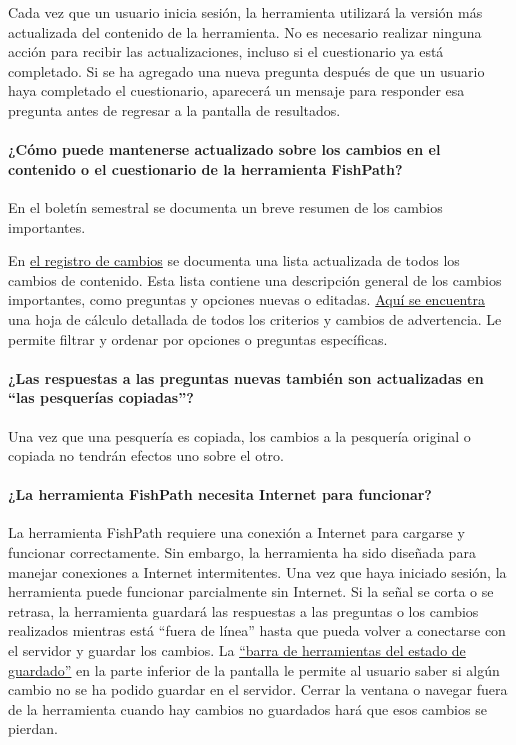 \documentclass[
  11pt,
]{book}
\begin{document}
Cada vez que un usuario inicia sesión, la herramienta utilizará la versión más actualizada del contenido de la herramienta. No es necesario realizar ninguna acción para recibir las actualizaciones, incluso si el cuestionario ya está completado. Si se ha agregado una nueva pregunta después de que un usuario haya completado el cuestionario, aparecerá un mensaje para responder esa pregunta antes de regresar a la pantalla de resultados.

\hypertarget{faq-stay-updated}{%
\paragraph{¿Cómo puede mantenerse actualizado sobre los cambios en el contenido o el cuestionario de la herramienta FishPath?}\label{faq-stay-updated}}

En el boletín semestral se documenta un breve resumen de los cambios importantes.

En \href{https://github.com/FishPath/FishPath-Tool-User-Guide/blob/master/Major\%20Content\%20Updates.md}{el registro de cambios} se documenta una lista actualizada de todos los cambios de contenido. Esta lista contiene una descripción general de los cambios importantes, como preguntas y opciones nuevas o editadas. \href{https://docs.google.com/spreadsheets/d/1HPlUvI6XuvXtYdFk5bpOsG4JR1fdM0D58KO5mBs0fyE/edit?usp=sharing}{Aquí se encuentra} una hoja de cálculo detallada de todos los criterios y cambios de advertencia. Le permite filtrar y ordenar por opciones o preguntas específicas.

\hypertarget{faq-copy-fisheries}{%
\paragraph{¿Las respuestas a las preguntas nuevas también son actualizadas en ``las pesquerías copiadas''?}\label{faq-copy-fisheries}}

Una vez que una pesquería es copiada, los cambios a la pesquería original o copiada no tendrán efectos uno sobre el otro.

\hypertarget{faq-internet}{%
\paragraph{¿La herramienta FishPath necesita Internet para funcionar?}\label{faq-internet}}

La herramienta FishPath requiere una conexión a Internet para cargarse y funcionar correctamente. Sin embargo, la herramienta ha sido diseñada para manejar conexiones a Internet intermitentes. Una vez que haya iniciado sesión, la herramienta puede funcionar parcialmente sin Internet. Si la señal se corta o se retrasa, la herramienta guardará las respuestas a las preguntas o los cambios realizados mientras está ``fuera de línea'' hasta que pueda volver a conectarse con el servidor y guardar los cambios. La \protect\hyperlink{la-barra-de-herramientas-del-estado-de-guardado}{``barra de herramientas del estado de guardado''} en la parte inferior de la pantalla le permite al usuario saber si algún cambio no se ha podido guardar en el servidor. Cerrar la ventana o navegar fuera de la herramienta cuando hay cambios no guardados hará que esos cambios se pierdan.
\end{document}
